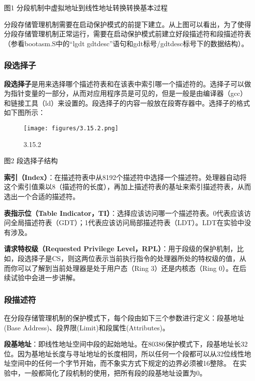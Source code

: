 图1 分段机制中虚拟地址到线性地址转换转换基本过程

分段存储管理机制需要在启动保护模式的前提下建立。从上图可以看出，为了使得分段存储管理机制正常运行，需要在启动保护模式前建立好段描述符和段描述符表（参看bootasm.S中的``lgdt
gdtdesc''语句和gdt标号/gdtdesc标号下的数据结构）。

\subsubsection{段选择子}\label{ux6bb5ux9009ux62e9ux5b50}

\textbf{段选择子}是用来选择哪个描述符表和在该表中索引哪一个描述符的。选择子可以做为指针变量的一部分，从而对应用程序员是可见的，但是一般是由编译器（gcc）和链接工具（ld）来设置的。段选择子的内容一般放在段寄存器中。选择子的格式如下图所示：

\begin{figure}[htbp]
\centering
\texttt{[image: figures/3.15.2.png]}
\caption{3.15.2}
\end{figure}

图2 段选择子结构

\textbf{索引（Index）}：在描述符表中从8192个描述符中选择一个描述符。处理器自动将这个索引值乘以8（描述符的长度），再加上描述符表的基址来索引描述符表，从而选出一个合适的描述符。

\textbf{表指示位（Table
Indicator，TI）}：选择应该访问哪一个描述符表。0代表应该访问全局描述符表（GDT）；1代表应该访问局部描述符表（LDT）。LDT在实验中没有涉及。

\textbf{请求特权级（Requested Privilege
Level，RPL）}：用于段级的保护机制，比如，段选择子是CS，则这两位表示当前执行指令的处理器所处的特权级的值，从而你可以了解到当前处理器是处于用户态（Ring
3）还是内核态（Ring 0）。在后续试验中会进一步讲解。

\subsubsection{段描述符}\label{ux6bb5ux63cfux8ff0ux7b26}

在分段存储管理机制的保护模式下，每个段由如下三个参数进行定义：段基地址(Base
Address)、段界限(Limit)和段属性(Attributes)。

\textbf{段基地址}：即线性地址空间中段的起始地址。在80386保护模式下，段基地址长32位。因为基地址长度与寻址地址的长度相同，所以任何一个段都可以从32位线性地址空间中的任何一个字节开始，而不象实方式下规定的边界必须被16整除。
在实验中，一般都简化了段机制的使用，把所有段的段基地址设置为0。

